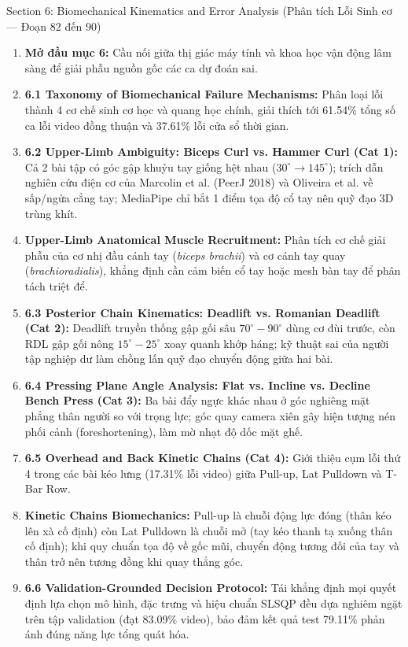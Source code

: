 \documentclass[10pt,a4paper]{article}
\begin{document}
\newpage

\begin{secbox}{Section 6: Biomechanical Kinematics and Error Analysis (Phân tích Lỗi Sinh cơ — Đoạn 82 đến 90)}
\begin{enumerate}[leftmargin=*, itemsep=2pt, topsep=1pt, start=82]
    \item \textbf{Mở đầu mục 6:} Cầu nối giữa thị giác máy tính và khoa học vận động lâm sàng để giải phẫu nguồn gốc các ca dự đoán sai.
    \item \textbf{6.1 Taxonomy of Biomechanical Failure Mechanisms:} Phân loại lỗi thành 4 cơ chế sinh cơ học và quang học chính, giải thích tới 61.54\% tổng số ca lỗi video đồng thuận và 37.61\% lỗi cửa sổ thời gian.
    \item \textbf{6.2 Upper-Limb Ambiguity: Biceps Curl vs. Hammer Curl (Cat 1):} Cả 2 bài tập có góc gập khuỷu tay giống hệt nhau ($30^\circ \to 145^\circ$); trích dẫn nghiên cứu điện cơ của Marcolin et al. (PeerJ 2018) và Oliveira et al. về sấp/ngửa cẳng tay; MediaPipe chỉ bắt 1 điểm tọa độ cổ tay nên quỹ đạo 3D trùng khít.
    \item \textbf{Upper-Limb Anatomical Muscle Recruitment:} Phân tích cơ chế giải phẫu của cơ nhị đầu cánh tay (\textit{biceps brachii}) và cơ cánh tay quay (\textit{brachioradialis}), khẳng định cần cảm biến cổ tay hoặc mesh bàn tay để phân tách triệt để.
    \item \textbf{6.3 Posterior Chain Kinematics: Deadlift vs. Romanian Deadlift (Cat 2):} Deadlift truyền thống gập gối sâu $70^\circ-90^\circ$ dùng cơ đùi trước, còn RDL gập gối nông $15^\circ-25^\circ$ xoay quanh khớp háng; kỹ thuật sai của người tập nghiệp dư làm chồng lấn quỹ đạo chuyển động giữa hai bài.
    \item \textbf{6.4 Pressing Plane Angle Analysis: Flat vs. Incline vs. Decline Bench Press (Cat 3):} Ba bài đẩy ngực khác nhau ở góc nghiêng mặt phẳng thân người so với trọng lực; góc quay camera xiên gây hiện tượng nén phối cảnh (foreshortening), làm mờ nhạt độ dốc mặt ghế.
    \item \textbf{6.5 Overhead and Back Kinetic Chains (Cat 4):} Giới thiệu cụm lỗi thứ 4 trong các bài kéo lưng (17.31\% lỗi video) giữa Pull-up, Lat Pulldown và T-Bar Row.
    \item \textbf{Kinetic Chains Biomechanics:} Pull-up là chuỗi động lực đóng (thân kéo lên xà cố định) còn Lat Pulldown là chuỗi mở (tay kéo thanh tạ xuống thân cố định); khi quy chuẩn tọa độ về gốc mũi, chuyển động tương đối của tay và thân trở nên tương đồng khi quay thẳng góc.
    \item \textbf{6.6 Validation-Grounded Decision Protocol:} Tái khẳng định mọi quyết định lựa chọn mô hình, đặc trưng và hiệu chuẩn SLSQP đều dựa nghiêm ngặt trên tập validation (đạt 83.09\% video), bảo đảm kết quả test 79.11\% phản ánh đúng năng lực tổng quát hóa.
\end{enumerate}
\end{secbox}
\end{document}
